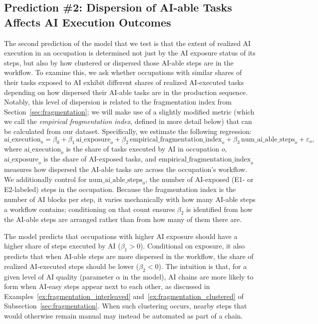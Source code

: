 \subsection{Prediction \#2: Dispersion of AI-able Tasks Affects AI Execution Outcomes}
\label{sec:fragmentation_prediction}

The second prediction of the model that we test is that the extent of realized AI execution in an occupation is determined not just by the AI exposure status of its steps, but also by how clustered or dispersed those AI-able steps are in the workflow.
To examine this, we ask whether occupations with similar shares of their tasks exposed to AI exhibit different shares of realized AI-executed tasks depending on how dispersed their AI-able tasks are in the production sequence.
Notably, this level of dispersion is related to the fragmentation index from Section~\ref{sec:fragmentation}; we will make use of a slightly modified metric (which we call the \emph{empirical fragmentation index}, defined in more detail below) that can be calculated from our dataset.
Specifically, we estimate the following regression:
\begin{equation}
    \text{ai\_execution}_{o} = \beta_0 + \beta_1 \, \text{ai\_exposure}_{o} + \beta_2 \, \text{empirical\_fragmentation\_index}_{o} + \beta_3 \, \text{num\_ai\_able\_steps}_{o} + \varepsilon_o,
    \label{eq:fragmentation_index_regression}
\end{equation}
where \emph{$\text{ai\_execution}_{o}$} is the share of tasks executed by AI in occupation $o$, \emph{$\text{ai\_exposure}_{o}$} is the share of AI-exposed tasks, and \emph{$\text{empirical\_fragmentation\_index}_{o}$} measures how dispersed the AI-able tasks are across the occupation's workflow. We additionally control for \emph{$\text{num\_ai\_able\_steps}_{o}$}, the number of AI-exposed (E1- or E2-labeled) steps in the occupation. Because the fragmentation index is the number of AI blocks per step, it varies mechanically with how many AI-able steps a workflow contains; conditioning on that count ensures $\beta_2$ is identified from how the AI-able steps are arranged rather than from how many of them there are.

The model predicts that occupations with higher AI exposure should have a higher share of steps executed by AI ($\beta_1 > 0$).
Conditional on exposure, it also predicts that when AI-able steps are more dispersed in the workflow, the share of realized AI-executed steps should be lower ($\beta_2 < 0$).
The intuition is that, for a given level of AI quality (parameter $\alpha$ in the model), AI chains are more likely to form when AI-easy steps appear next to each other, as discussed in Examples~\ref{ex:fragmentation_interleaved} and~\ref{ex:fragmentation_clustered} of Subsection~\ref{sec:fragmentation}.
When such clustering occurs, nearby steps that would otherwise remain manual may instead be automated as part of a chain.

